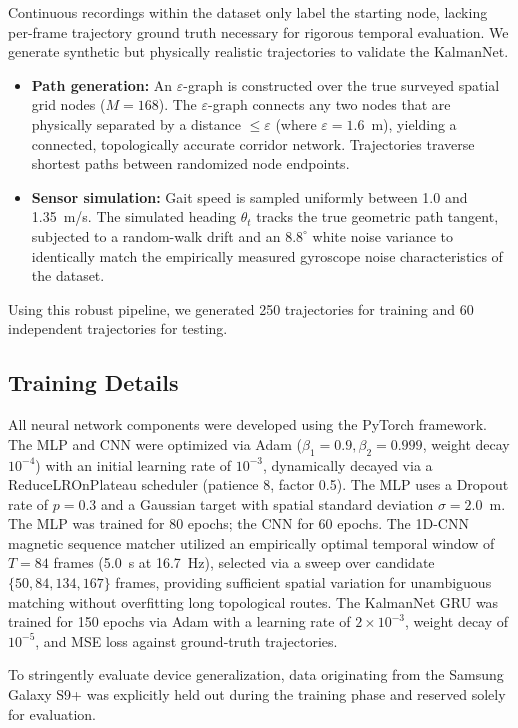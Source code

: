 \documentclass[conference]{IEEEtran}
\begin{document}
Continuous recordings within the dataset only label the starting node, lacking per-frame trajectory ground truth necessary for rigorous temporal evaluation. We generate synthetic but physically realistic trajectories to validate the KalmanNet.

\begin{itemize}
    \item \textbf{Path generation:} An $\varepsilon$-graph is constructed over the true surveyed spatial grid nodes ($M=168$). The $\varepsilon$-graph connects any two nodes that are physically separated by a distance $\leq \varepsilon$ (where $\varepsilon = 1.6$~m), yielding a connected, topologically accurate corridor network. Trajectories traverse shortest paths between randomized node endpoints.
    \item \textbf{Sensor simulation:} Gait speed is sampled uniformly between 1.0 and 1.35~m/s. The simulated heading $\theta_t$ tracks the true geometric path tangent, subjected to a random-walk drift and an $8.8^{\circ}$ white noise variance to identically match the empirically measured gyroscope noise characteristics of the dataset.
\end{itemize}
Using this robust pipeline, we generated 250 trajectories for training and 60 independent trajectories for testing.

\subsection{Training Details}

All neural network components were developed using the PyTorch framework. The MLP and CNN were optimized via Adam ($\beta_1 = 0.9, \beta_2 = 0.999$, weight decay $10^{-4}$) with an initial learning rate of $10^{-3}$, dynamically decayed via a ReduceLROnPlateau scheduler (patience 8, factor 0.5). The MLP uses a Dropout rate of $p = 0.3$ and a Gaussian target with spatial standard deviation $\sigma = 2.0$~m. The MLP was trained for 80 epochs; the CNN for 60 epochs. The 1D-CNN magnetic sequence matcher utilized an empirically optimal temporal window of $T = 84$ frames (5.0~s at 16.7~Hz), selected via a sweep over candidate $\{50, 84, 134, 167\}$ frames, providing sufficient spatial variation for unambiguous matching without overfitting long topological routes. The KalmanNet GRU was trained for 150 epochs via Adam with a learning rate of $2 \times 10^{-3}$, weight decay of $10^{-5}$, and MSE loss against ground-truth trajectories.

To stringently evaluate device generalization, data originating from the Samsung Galaxy S9+ was explicitly held out during the training phase and reserved solely for evaluation.
\end{document}
